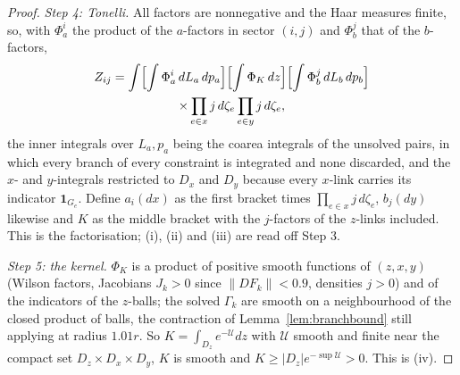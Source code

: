 \documentclass[11pt]{amsart}
\theoremstyle{definition}
\theoremstyle{remark}
\numberwithin{equation}{section}
\begin{document}
\begin{proof}
\emph{Step 4: Tonelli.} All factors are nonnegative and the Haar measures
finite, so, with $\Phi^i_a$ the product of the $a$-factors in sector
$(i,j)$ and $\Phi^j_b$ that of the $b$-factors,
\begin{multline*}
Z_{ij}=\int\Bigl[\int\Phi^i_a\,dL_a\,dp_a\Bigr]\Bigl[\int\Phi_K\,dz\Bigr]
\Bigl[\int\Phi^j_b\,dL_b\,dp_b\Bigr]\\
\times\prod_{e\in x}j\,d\zeta_e\prod_{e\in y}j\,d\zeta_e ,
\end{multline*}
the inner integrals over $L_a,p_a$ being the coarea integrals of the
unsolved pairs, in which every branch of every constraint is integrated
and none discarded, and the $x$- and $y$-integrals restricted to $D_x$ and
$D_y$ because every $x$-link carries its indicator $\mathbf 1_{G_e}$.
Define $a_i(dx)$ as the first bracket times $\prod_{e\in x}j\,d\zeta_e$,
$b_j(dy)$ likewise and $K$ as the middle bracket with the $j$-factors of
the $z$-links included. This is the factorisation; (i), (ii) and (iii)
are read off Step 3.

\emph{Step 5: the kernel.} $\Phi_K$ is a product of positive smooth
functions of $(z,x,y)$ (Wilson factors, Jacobians $J_k>0$ since
$\lVert DF_k\rVert<0.9$, densities $j>0$) and of the indicators of the
$z$-balls; the solved $\Gamma_k$ are smooth on a neighbourhood of the
closed product of balls, the contraction of Lemma~\ref{lem:branchbound}
still applying at radius $1.01r$. So $K=\int_{D_z}e^{-\mathcal U}dz$ with
$\mathcal U$ smooth and finite near the compact set
$D_z\times D_x\times D_y$, $K$ is smooth and
$K\ge\lvert D_z\rvert e^{-\sup\mathcal U}>0$. This is (iv).


\end{proof}
\end{document}
